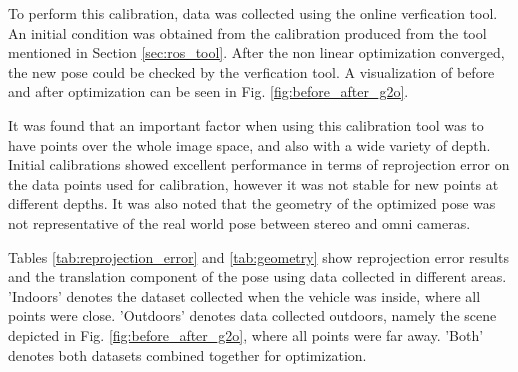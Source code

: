 To perform this calibration, data was collected using the online verfication tool.  An initial condition was obtained from the calibration produced from the tool mentioned in Section \ref{sec:ros_tool}.  After the non linear optimization converged, the new pose could be checked by the verfication tool.  A visualization of before and after optimization can be seen in Fig. \ref{fig:before_after_g2o}. 

It was found that an important factor when using this calibration tool was to have points over the whole image space, and also with a wide variety of depth.  Initial calibrations showed excellent performance in terms of reprojection error on the data points used for calibration, however it was not stable for new points at different depths.  It was also noted that the geometry of the optimized pose was not representative of the real world pose between stereo and omni cameras.  

Tables \ref{tab:reprojection_error} and \ref{tab:geometry} show reprojection error results and the translation component of the pose using data collected in different areas.  'Indoors' denotes the dataset collected when the vehicle was inside, where all points were close. 'Outdoors' denotes data collected outdoors, namely the scene depicted in Fig. \ref{fig:before_after_g2o}, where all points were far away.  'Both' denotes both datasets combined together for optimization.


